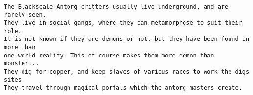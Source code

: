 \





\clearpage

\goodbreak \begin{samepage} \small \begin{verbatim}
The Blackscale Antorg critters usually live underground, and are rarely seen.
They live in social gangs, where they can metamorphose to suit their role.
It is not known if they are demons or not, but they have been found in more than
one world reality. This of course makes them more demon than monster...
They dig for copper, and keep slaves of various races to work the digs sites.
They travel through magical portals which the antorg masters create.
\end{verbatim} \normalsize \end{samepage}

\

